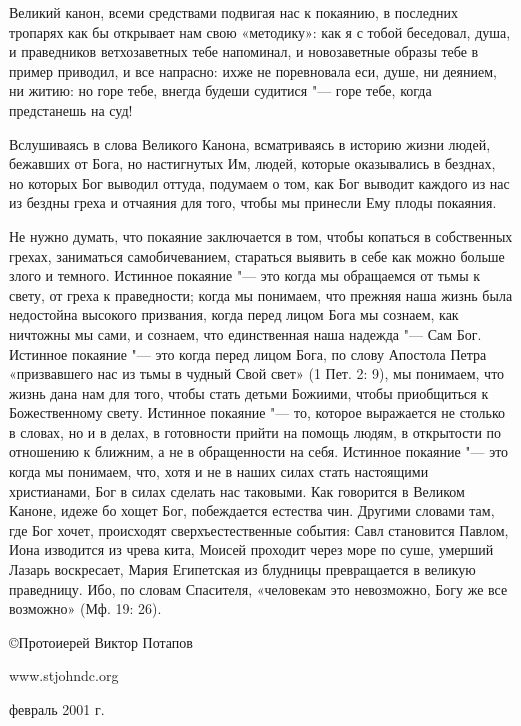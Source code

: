 Великий канон, всеми средствами подвигая нас к покаянию, в последних тропарях как бы открывает нам свою «методику»: как я с тобой беседовал, душа, и праведников ветхозаветных тебе напоминал, и новозаветные образы тебе в пример приводил, и все напрасно: ихже не поревновала еси, душе, ни деянием, ни житию: но горе тебе, внегда будеши судитися "--- горе тебе, когда предстанешь на суд!


Вслушиваясь в слова Великого Канона, всматриваясь в историю жизни людей, бежавших от Бога, но настигнутых Им, людей, которые оказывались в безднах, но которых Бог выводил оттуда, подумаем о том, как Бог выводит каждого из нас из бездны греха и отчаяния для того, чтобы мы принесли Ему плоды покаяния.


Не нужно думать, что покаяние заключается в том, чтобы копаться в собственных грехах, заниматься самобичеванием, стараться выявить в себе как можно больше злого и темного. Истинное покаяние "--- это когда мы обращаемся от тьмы к свету, от греха к праведности; когда мы понимаем, что прежняя наша жизнь была недостойна высокого призвания, когда перед лицом Бога мы сознаем, как ничтожны мы сами, и сознаем, что единственная наша надежда "--- Сам Бог. Истинное покаяние "--- это когда перед лицом Бога, по слову Апостола Петра «призвавшего нас из тьмы в чудный Свой свет» (1 Пет. 2: 9), мы понимаем, что жизнь дана нам для того, чтобы стать детьми Божиими, чтобы приобщиться к Божественному свету. Истинное покаяние "--- то, которое выражается не столько в словах, но и в делах, в готовности прийти на помощь людям, в открытости по отношению к ближним, а не в обращенности на себя. Истинное покаяние "--- это когда мы понимаем, что, хотя и не в наших силах стать настоящими христианами, Бог в силах сделать нас таковыми. Как говорится в Великом Каноне, идеже бо хощет Бог, побеждается естества чин. Другими словами там, где Бог хочет, происходят сверхъестественные события: Савл становится Павлом, Иона изводится из чрева кита, Моисей проходит через море по суше, умерший Лазарь воскресает, Мария Египетская из блудницы превращается в великую праведницу. Ибо, по словам Спасителя, «человекам это невозможно, Богу же все возможно» (Мф. 19: 26).


©Протоиерей Виктор Потапов


www.stjohndc.org


февраль 2001 г.


\bigskip\bigskip\mychapterending

 
